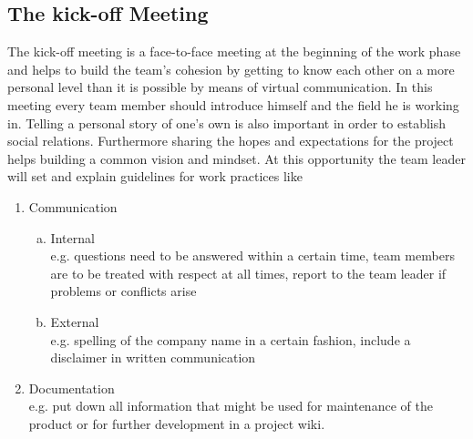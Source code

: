 \subsection{The kick-off Meeting}
\begin{multicols}{2}
The kick-off meeting is a face-to-face meeting at the beginning of the work phase and helps to build the team’s cohesion by getting to know each other on a more personal level than it is possible by means of virtual communication.
In this meeting every team member should introduce himself and the field he is working in. Telling a personal story of one's own is also important in order to establish social relations. Furthermore sharing the hopes and expectations for the project helps building a common vision and mindset.
At this opportunity the team leader will set and explain guidelines for work practices like 
 \begin{enumerate}[1.]
	\item Communication
		\begin{enumerate}[a)]
		  	\item Internal\\ 
				e.g. questions need to be answered within a certain time, team members are to be treated with respect at all times, report to the team leader if problems or conflicts arise
			\item External\\
				e.g. spelling of the company name in a certain fashion, include a disclaimer in written communication
		\end{enumerate}
	\item Documentation\\
e.g. put down all information that might be used for maintenance of the product or for further development in a project wiki.  \end{enumerate}
\end{multicols}